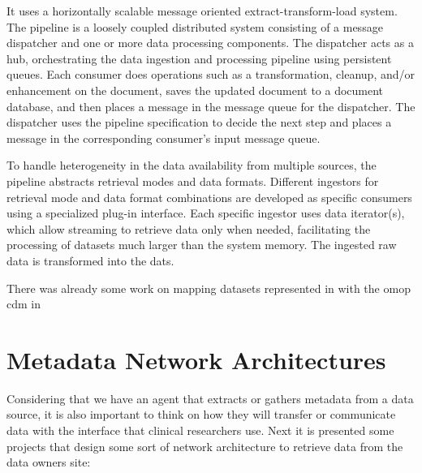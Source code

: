 It uses a horizontally scalable message oriented extract-transform-load system.
The pipeline is a loosely coupled distributed system consisting of a message dispatcher and one or more data processing components.
The dispatcher acts as a hub, orchestrating the data ingestion and processing pipeline using persistent queues.
Each consumer does operations such as a transformation, cleanup, and/or enhancement on the document, saves the updated document to a document database, and then places a message in the message queue for the dispatcher.
The dispatcher uses the pipeline specification to decide the next step and places a message in the corresponding consumer’s input message queue.

To handle heterogeneity in the data availability from multiple sources, the pipeline abstracts retrieval modes and data formats.
Different ingestors for retrieval mode and data format combinations are developed as specific consumers using a specialized plug-in interface.
Each specific ingestor uses data iterator(s), which allow streaming to retrieve data only when needed, facilitating the processing of datasets much larger than the system memory.
The ingested raw data is transformed into the \gls{dats}.

There was already some work on mapping datasets represented in with the \gls{omop} \gls{cdm} in \cite{cdm-dats}



\section{Metadata Network Architectures}  %

Considering that we have an agent that extracts or gathers metadata from a data source,
it is also important to think on how they will transfer or communicate data with the
interface that clinical researchers use.
Next it is presented some projects that design some sort of network architecture to
retrieve data from the data owners site:


